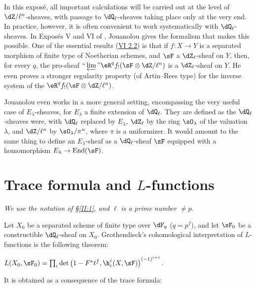 \documentclass[oneside]{book}
\begin{document}
In this exposé, all important calculations will be carried out at the level
of $\dZ/\ell^n$-sheaves, with passage to $\dQ_\ell$-sheaves taking place only
at the very end. In practice, however, it is often convenient to work
systematically with $\dQ_\ell$-sheaves. In Exposés V and VI of
\cite{sga5}, Jouanolou gives the formalism that makes this possible. One of
the essential results (\hyperref[VI:2-2]{VI 2.2}) is that if $f:X\to Y$ is a separated morphism
of finite type of Noetherian schemes, and $\sF$ a $\dZ_\ell$-sheaf on $Y$,
then, for every $q$, the pro-sheaf
$\text{``}\varprojlim\text{''}\eR^q f_! (\sF\otimes\dZ/\ell^n)$ is a
$\dZ_\ell$-sheaf on $Y$. He even proves a stronger regularity property (of
Artin--Rees type) for the inverse system of the
$\eR^q f_!(\sF\otimes\dZ/\ell^n)$.

Jouanolou even works in a more general setting, encompassing the very useful
case of $E_\lambda$-sheaves, for $E_\lambda$ a finite extension of
$\dQ_\ell$. They are defined as the $\dQ_\ell$-sheaves were, with
$\dQ_\ell$ replaced by $E_\lambda$, $\dZ_\ell$ by the ring $\sO_\lambda$ of
the valuation $\lambda$, and $\dZ/\ell^n$ by $\sO_\lambda/\pi^n$, where
$\pi$ is a uniformizer. It would amount to the same thing to define an
$E_\lambda$-sheaf as a $\dQ_\ell$-sheaf $\sF$ equipped with a homomorphism
$E_\lambda\to\operatorname{End}(\sF)$.









\section{Trace formula and \texorpdfstring{$L$}{L}-functions}\label{II:3}

\emph{We use the notation of \S\ref{II:1}, and $\ell$ is a prime number
$\ne p$.}

Let $X_0$ be a separated scheme of finite type over $\dF_q$ ($q=p^f$), and
let $\sF_0$ be a constructible $\dQ_\ell$-sheaf on $X_0$. Grothendieck's
cohomological interpretation of $L$-functions is the following theorem:






\begin{theorem_}\label{II:3-1}
$L(X_0,\sF_0) = \prod_i \det\left(1-F^* t^f, \h_c^i(X,\sF)\right)^{(-1)^{i+1}}$.
\end{theorem_}

It is obtained as a consequence of the trace formula:
\end{document}

